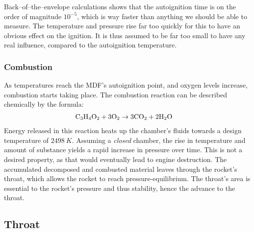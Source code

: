 		Back--of--the--envelope calculations shows that the autoignition time is on the order of magnitude $10^{-5}$, which is way faster than anything we should be able to measure. The temperature and pressure rise far too quickly for this to have an obvious effect on the ignition. It is thus assumed to be far too small to have any real influence, compared to the autoignition temperature.

	\subsubsection{Combustion}

		As temperatures reach the MDF's autoignition point, and oxygen levels increase, combustion starts taking place. The combustion reaction can be described chemically by the formula:
			\begin{align}
				\mathrm{C_3 H_4 O_2 + 3 O_2} &\rightarrow \mathrm{3 CO_2 + 2H_2O}
			\end{align}
		Energy released in this reaction heats up the chamber's fluids towards a design temperature of $\SI{2498}{K}$. Assuming a \emph{closed} chamber, the rise in temperature and amount of substance yields a rapid increase in pressure over time. This is not a desired property, as that would eventually lead to engine destruction. The accumulated decomposed and combusted material leaves through the rocket's throat, which allows the rocket to reach pressure-equilibrium. The throat's area is essential to the rocket's pressure and thus stability, hence the advance to the throat.

\subsection{Throat}

